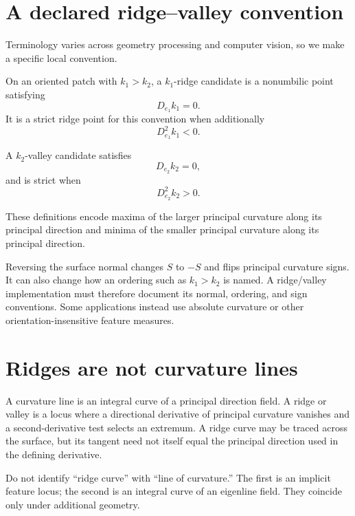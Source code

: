 \section{A declared ridge--valley convention}

Terminology varies across geometry processing and computer vision, so we make a
specific local convention.

\begin{definition}\label{def:vii42-ridge}
On an oriented patch with \(k_1>k_2\), a \(k_1\)-ridge candidate is a nonumbilic
point satisfying
\[
D_{e_1}k_1=0.
\]
It is a strict ridge point for this convention when additionally
\[
D_{e_1}^2k_1<0.
\]
\end{definition}

\begin{definition}\label{def:vii42-valley}
A \(k_2\)-valley candidate satisfies
\[
D_{e_2}k_2=0,
\]
and is strict when
\[
D_{e_2}^2k_2>0.
\]
\end{definition}

These definitions encode maxima of the larger principal curvature along its
principal direction and minima of the smaller principal curvature along its
principal direction.

\begin{warning}\label{warn:vii42-orientation}
Reversing the surface normal changes \(S\) to \(-S\) and flips principal
curvature signs.  It can also change how an ordering such as \(k_1>k_2\) is
named.  A ridge/valley implementation must therefore document its normal,
ordering, and sign conventions.  Some applications instead use absolute
curvature or other orientation-insensitive feature measures.
\end{warning}

\section{Ridges are not curvature lines}

A curvature line is an integral curve of a principal direction field.  A ridge
or valley is a locus where a directional derivative of principal curvature
vanishes and a second-derivative test selects an extremum.  A ridge curve may be
traced across the surface, but its tangent need not itself equal the principal
direction used in the defining derivative.

\begin{warning}\label{warn:vii42-ridge-line}
Do not identify ``ridge curve'' with ``line of curvature.''  The first is an
implicit feature locus; the second is an integral curve of an eigenline field.
They coincide only under additional geometry.
\end{warning}

